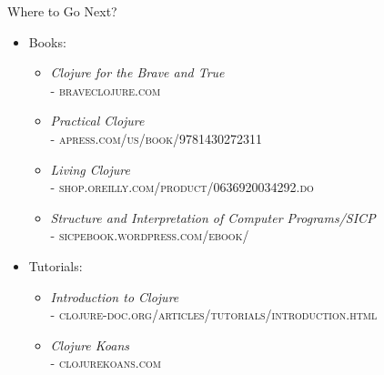 \documentclass[pdf]{beamer}
\begin{document}
\begin{frame}{Where to Go Next?}
  \pause
  \begin{itemize}
  \item Books:
    \pause
    \begin{itemize}
    \item \textit{Clojure for the Brave and True} \\ - {\scriptsize \textsc{braveclojure.com}}
      \pause
    \item \textit{Practical Clojure} \\ - {\scriptsize \textsc{apress.com/us/book/9781430272311}}
      \pause
    \item \textit{Living Clojure} \\ - {\scriptsize \textsc{shop.oreilly.com/product/0636920034292.do}}
      \pause
    \item \textit{Structure and Interpretation of Computer Programs/SICP} \\ - {\scriptsize \textsc{sicpebook.wordpress.com/ebook/}}
    \end{itemize}
    \pause
  \item Tutorials:
    \pause
    \begin{itemize}
    \item \textit{Introduction to Clojure} \\ - {\scriptsize \textsc{clojure-doc.org/articles/tutorials/introduction.html}}
      \pause
    \item \textit{Clojure Koans} \\ - {\scriptsize \textsc{clojurekoans.com}}
    \end{itemize}
  \end{itemize}
\end{frame}


\end{document}

